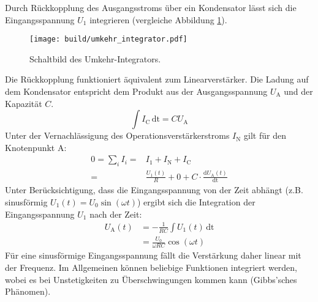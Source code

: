 Durch Rückkopplung des Ausgangsstroms über ein Kondensator lässt sich die
Eingangsspannung $U_1$ integrieren (vergleiche Abbildung \ref{fig:integrator}).
\begin{figure}[ht]
		\centering
		\texttt{[image: build/umkehr\_integrator.pdf]}
		\caption{Schaltbild des Umkehr-Integrators.\cite{anleitung}}
		\label{fig:integrator}
\end{figure}
Die Rückkopplung funktioniert äquivalent zum Linearverstärker.
Die Ladung auf dem Kondensator entspricht dem Produkt aus der Ausgangsspannung
$U_\text{A}$ und der Kapazität $C$.
\begin{equation}
		\int I_\text{C} \, \text{dt} = C U_\text{A}
\end{equation}
Unter der Vernachlässigung des Operationsverstärkerstroms $I_\text{N}$ gilt
für den Knotenpunkt A:
\begin{align}
		0 = \sum_i I_i =& I_1 + I_\text{N} + I_\text{C} \nonumber \\
		=& \frac{U_1(t)}{R} + 0 + C \cdot \frac{\text{d} U_\text{A}(t)}{\text{dt}}
\end{align}
Unter Berücksichtigung, dass die Eingangsspannung von der Zeit abhängt (z.B.
sinusförmig $U_1(t)= U_0 \sin(\omega t)$) ergibt sich die Integration der Eingangsspannung $U_1$ nach der Zeit:
\begin{align}
  U_\text{A}(t) &= - \frac{1}{RC} \int U_\text{1}(t) \, \text{dt} \nonumber \\
                  &= \frac{U_0}{\omega R C} \cos (\omega t) \label{eq:integrator}
\end{align}
Für eine sinusförmige Eingangsspannung fällt die Verstärkung daher linear mit
der Frequenz.
Im Allgemeinen können beliebige Funktionen integriert werden, wobei es bei
Unstetigkeiten zu Überschwingungen kommen kann (Gibbs'sches Phänomen).

